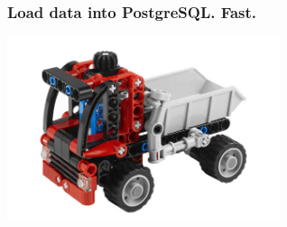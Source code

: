 \documentclass{beamer}
\begin{document}
\begin{frame}
  \frametitle{Load data into PostgreSQL. Fast.}


  \begin{center}
    \includegraphics[height=2.1in]{pgloader.jpg}
  \end{center}
\end{frame}
\end{document}
